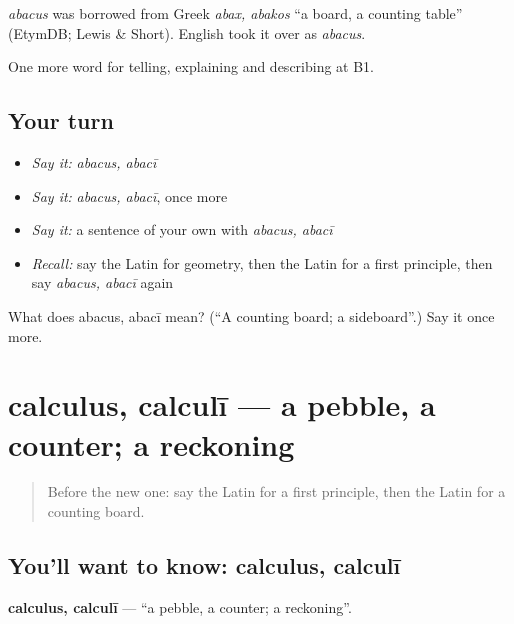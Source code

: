 \begin{cousinweb}
\emph{abacus} was borrowed from Greek \emph{abax, abakos} \textquotedblleft{}a board, a counting table\textquotedblright{} (EtymDB; Lewis \& Short). English took it over as \emph{abacus}.
\end{cousinweb}

\begin{grammarlens}[title={What you've built}]
One more word for telling, explaining and describing at B1.
\end{grammarlens}

\subsection*{Your turn}
\begin{itemize}
\raggedright
  \item \emph{Say it:} \emph{abacus, abacī}
  \item \emph{Say it:} \emph{abacus, abacī}, once more
  \item \emph{Say it:} a sentence of your own with \emph{abacus, abacī}
  \item \emph{Recall:} say the Latin for geometry, then the Latin for a first principle, then say \emph{abacus, abacī} again
\end{itemize}

\begin{tcolorbox}[breakable,colback=teal!4,colframe=teal!35!black,title={Before you move on}]
What does abacus, abacī mean? (\textquotedblleft{}A counting board; a sideboard\textquotedblright{}.) Say it once more.
\end{tcolorbox}
\section[calculus, calculī]{calculus, calculī — a pebble, a counter; a reckoning}

\label{lesson:LA-C405-calculus}



\begin{quote}
Before the new one: say the Latin for a first principle, then the Latin for a counting board.
\end{quote}

\subsection*{You'll want to know: calculus, calculī}
\textbf{calculus, calculī} — \textquotedblleft{}a pebble, a counter; a reckoning\textquotedblright{}.

